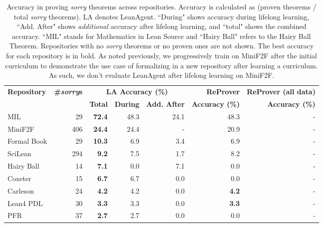 \begin{table}
    \caption{Accuracy in proving \textit{sorry} theorems across repositories. Accuracy is calculated as (proven theorems / total \textit{sorry} theorems). LA denotes LeanAgent. ``During" shows accuracy during lifelong learning, ``Add. After" shows \textit{additional} accuracy after lifelong learning, and ``total" shows the combined accuracy. ``MIL" stands for Mathematics in Lean Source and ``Hairy Ball" refers to the Hairy Ball Theorem. Repositories with no \textit{sorry} theorems or no proven ones are not shown. The best accuracy for each repository is in bold. As noted previously, we progressively train on MiniF2F after the initial curriculum to demonstrate the use case of formalizing in a new repository after learning a curriculum. As such, we don't evaluate LeanAgent after lifelong learning on MiniF2F.}
    \label{tab:theorem-proofs1}
    \centering
    \begin{tabular}{l|r|rrr|r|r}
    \hline
    \textbf{Repository} & \textbf{\#\textit{sorry}s} & \multicolumn{3}{c|}{\textbf{LA Accuracy (\%)}} & \textbf{ReProver} & \textbf{ReProver (all data)} \\
    & & \textbf{Total} & \textbf{During} & \textbf{Add. After} & \textbf{Accuracy (\%)} & \textbf{Accuracy (\%)} \\
    \hline
    MIL & 29 & \textbf{72.4} & 48.3 & 24.1 & 48.3 & - \\
    MiniF2F & 406 & \textbf{24.4} & 24.4 & - & 20.9 & - \\
    Formal Book & 29 & \textbf{10.3} & 6.9 & 3.4 & 6.9 & - \\
    SciLean & 294 & \textbf{9.2} & 7.5 & 1.7 & 8.2 & - \\
    Hairy Ball & 14 & \textbf{7.1} & 0.0 & 7.1 & 0.0 & - \\
    Coxeter & 15 & \textbf{6.7} & 6.7 & 0.0 & 0.0 & - \\
    Carleson & 24 & \textbf{4.2} & 4.2 & 0.0 & \textbf{4.2} & - \\
    Lean4 PDL & 30 & \textbf{3.3} & 3.3 & 0.0 & \textbf{3.3} & - \\
    PFR & 37 & \textbf{2.7} & 2.7 & 0.0 & 0.0 & - \\
    \hline
    \end{tabular}
\end{table}